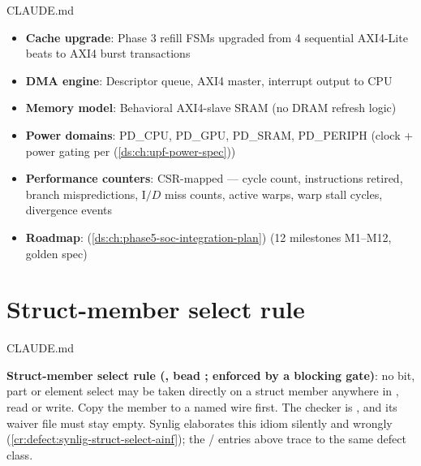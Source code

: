 \begin{relocated}{CLAUDE.md}
\begin{itemize}
  \begin{itemize}
  \tightlist
  \item
    AXI4 masters: CPU D-cache (upgraded to burst), GPU, DMA engine
  \item
    AXI4 slave: behavioral SRAM controller (no DRAM refresh)
  \item
    AXI-Lite slaves: GPU/DMA config registers, UART, SPI, timer, IRQ
    controller
  \end{itemize}
\item
  \textbf{Cache upgrade}: Phase 3 refill FSMs upgraded from 4 sequential
  AXI4-Lite beats to AXI4 burst transactions
\item
  \textbf{DMA engine}: Descriptor queue, AXI4 master, interrupt output
  to CPU
\item
  \textbf{Memory model}: Behavioral AXI4-slave SRAM (no DRAM refresh
  logic)
\item
  \textbf{Power domains}: PD\_CPU, PD\_GPU, PD\_SRAM, PD\_PERIPH (clock
  + power gating per  (\cref{ds:ch:upf-power-spec}))
\item
  \textbf{Performance counters}: CSR-mapped --- cycle count,
  instructions retired, branch mispredictions, I\(/D\) miss counts,
  active warps, warp stall cycles, divergence events
\item
  \textbf{Roadmap}:  (\cref{ds:ch:phase5-soc-integration-plan}) (12
  milestones M1--M12, golden spec)
\end{itemize}
\end{relocated}


\chapter{Struct-member select rule}\label{ds:inv:struct-member-select}
\begin{relocated}{CLAUDE.md}

\textbf{Struct-member select rule (, bead ; enforced
by a blocking  gate)}: no bit, part or element select
may be taken directly on a struct member anywhere in , read or
write. Copy the member to a named wire first. The checker is
, and its waiver file
 must stay empty.
Synlig elaborates this idiom silently and wrongly
(\cref{cr:defect:synlig-struct-select-ainf}); the /
entries above trace to the same defect class.
\end{relocated}


